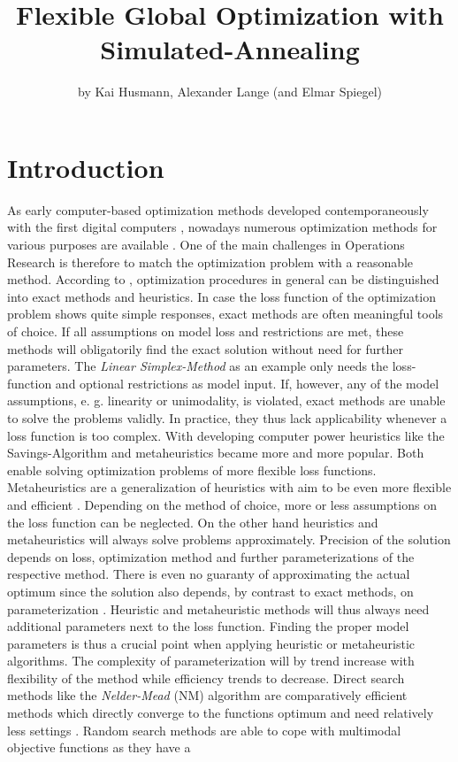 \title{Flexible Global Optimization with Simulated-Annealing}
\author{by Kai Husmann, Alexander Lange (and Elmar Spiegel)}

\maketitle


\section{Introduction}

As early computer-based optimization methods developed contemporaneously with the first digital computers \citep{corana_1987}, nowadays numerous optimization methods for various purposes are available \citep{wegener_2005}. One of the main challenges in Operations Research is therefore to match the optimization problem with a reasonable method. According to  \citet{kirkpatrick_1983}, optimization procedures in general can be distinguished into exact methods and heuristics. In case the loss function of the optimization problem shows quite simple responses, exact methods are often meaningful tools of choice. If all assumptions on model loss and restrictions are met, these methods will obligatorily find the exact solution without need for further parameters. The  \textit{Linear Simplex-Method} \citep{dantzig_1959} as an example only needs the loss-function and optional restrictions as model input. If, however, any of the model assumptions, e. g. linearity or unimodality, is violated, exact methods are unable to solve the problems validly. In practice, they thus lack applicability whenever a loss function is too complex. With developing computer power heuristics like the Savings-Algorithm \citep{clarke_1964} and metaheuristics became more and more popular. Both enable solving optimization problems of more flexible loss functions. Metaheuristics are a generalization of heuristics with aim to be even more flexible and efficient \citep{blum_2003}. Depending on the method of choice, more or less assumptions on the loss function can be neglected. On the other hand heuristics and metaheuristics will always solve problems approximately. Precision of the solution depends on loss, optimization method and further parameterizations of the respective method. There is even no guaranty of approximating the actual optimum since the solution also depends, by contrast to exact methods, on parameterization \citep{blum_2003}. Heuristic and metaheuristic methods will thus always need additional parameters next to the loss function. Finding the proper model parameters is thus a crucial point when applying heuristic or metaheuristic algorithms. The complexity of parameterization will by trend increase with flexibility of the method while efficiency trends to decrease. Direct search methods like the \textit{Nelder-Mead} (NM) algorithm are comparatively efficient methods which directly converge to the functions optimum and need relatively less settings \citep{geiger_1999}. Random search methods are able to cope with multimodal objective functions as they have a 